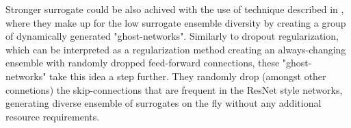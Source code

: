 Stronger surrogate could be also achived with the use of technique described in \cite{li2019learning}, where they make up for the low surrogate ensemble diversity by creating a group of dynamically generated "ghost-networks". Similarly to dropout regularization, which can be interpreted as a regularization method creating an always-changing ensemble with randomly dropped feed-forward connections, these "ghost-networks" take this idea a step further. They randomly drop (amongst other connetions) the skip-connections that are frequent in the ResNet style networks, generating diverse ensemble of surrogates on the fly without any additional resource requirements.
